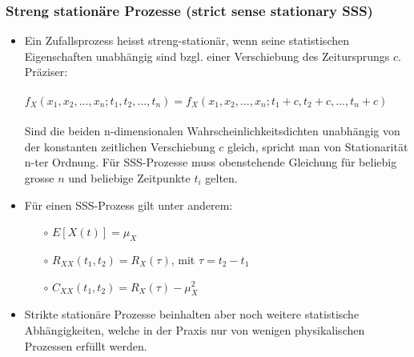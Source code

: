 \documentclass[10pt, a4paper]{article}
\begin{document}
\subsubsection{Streng station\"are Prozesse (strict sense stationary SSS)}
\begin{itemize}
  \item Ein Zufallsprozess heisst streng-station\"ar, wenn seine statistischen Eigenschaften
        unabh\"angig sind bzgl. einer Verschiebung des Zeitursprungs $c$. Pr\"aziser: \\ \\
        $f_{X}(x_{1},x_{2},...,x_{n};t_{1},t_{2},...,t_{n}) =
         f_{X}(x_{1},x_{2},...,x_{n};t_{1}+c,t_{2}+c,...,t_{n}+c) $ \\ \\
        Sind die beiden n-dimensionalen Wahrscheinlichkeitsdichten unabh\"angig
        von der konstanten zeitlichen Verschiebung $c$ gleich,
        spricht man von Stationarit\"at n-ter Ordnung.
        F\"ur SSS-Prozesse muss obenstehende Gleichung f\"ur beliebig grosse $n$
        und beliebige Zeitpunkte $t_{i}$ gelten.
  \item F\"ur einen SSS-Prozess gilt unter anderem:
  \begin{itemize}
     \item[$\circ$] $E[X(t)] = \mu_{X}$
     \item[$\circ$] $R_{XX}(t_{1},t_{2}) = R_{X}(\tau)$, \hspace{10pt} mit $\tau = t_{2} - t_{1}$
     \item[$\circ$] $C_{XX}(t_{1},t_{2}) = R_{X}(\tau) - \mu_{X}^{2}$
  \end{itemize} 
  \item Strikte station\"are Prozesse beinhalten aber noch weitere statistische Abh\"angigkeiten,
        welche in der Praxis nur von wenigen physikalischen Prozessen erf\"ullt werden.
\end{itemize} 
\end{document}
